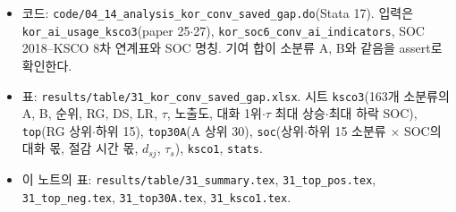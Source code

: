 \documentclass[11pt]{article}
\begin{document}
\begin{itemize}[leftmargin=*]
  \item 코드: \texttt{code/04\_14\_analysis\_kor\_conv\_saved\_gap.do}(Stata 17). 입력은 \texttt{kor\_ai\_usage\_ksco3}(paper 25$\cdot$27), \texttt{kor\_soc6\_conv\_ai\_indicators}, SOC 2018--KSCO 8차 연계표와 SOC 명칭. 기여 합이 소분류 A, B와 같음을 assert로 확인한다.
  \item 표: \texttt{results/table/31\_kor\_conv\_saved\_gap.xlsx}. 시트 \texttt{ksco3}(163개 소분류의 A, B, 순위, RG, DS, LR, $\tau$, 노출도, 대화 1위$\cdot\tau$ 최대 상승$\cdot$최대 하락 SOC), \texttt{top}(RG 상위$\cdot$하위 15), \texttt{top30A}(A 상위 30), \texttt{soc}(상위$\cdot$하위 15 소분류 $\times$ SOC의 대화 몫, 절감 시간 몫, $d_{sj}$, $\tau_s$), \texttt{ksco1}, \texttt{stats}.
  \item 이 노트의 표: \texttt{results/table/31\_summary.tex}, \texttt{31\_top\_pos.tex}, \texttt{31\_top\_neg.tex}, \texttt{31\_top30A.tex}, \texttt{31\_ksco1.tex}.
\end{itemize}

\printbibliography[title={참고문헌}]
\end{document}

